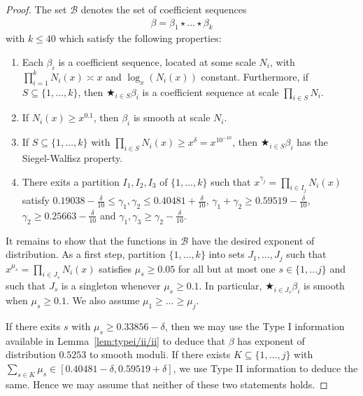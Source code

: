 \documentclass{amsart}
\numberwithin{equation}{section}
\begin{document}
\begin{proof}
\vspace{3mm} The set $\mathcal{B}$ denotes the set of coefficient sequences 
\begin{align*}
\beta=\beta_1 \star \dots \star \beta_{k}
\end{align*}
with $k \leq 40$ which satisfy the following properties:
\begin{enumerate}
\item Each $\beta_i$ is a coefficient sequence, located at some scale $N_i$, with $\prod_{ i =1}^k N_i(x) \asymp x$ and $\log_x(N_i(x))$ constant.   Furthermore, if $S \subseteq \{1, \dots, k\}$, then $\bigstar_{i \in S} \beta_i$ is a coefficient sequence at scale $\prod_{i \in S} N_i$.
\item If $N_i(x) \geq x^{0.1}$, then $\beta_i$ is smooth at scale $N_i$. 
\item If $S \subseteq \{1, \dots, k\}$ with $\prod_{i \in S} N_i(x) \geq x^{\delta} = x^{10^{-10}}$, then $\bigstar_{i \in S} \beta_i$ has the Siegel-Walfisz property. 
\item There exits a partition $I_1, I_2, I_3$ of $\{1, \dots, k\}$ such that $x^{\gamma_j}=\prod_{i \in I_j} N_i(x)$ satisfy  $0.19038-\frac{\delta}{10} \leq \gamma_1, \gamma_2 \leq 0.40481+\frac{\delta}{10}$, $\gamma_1 + \gamma_2 \geq 0.59519 - \frac{\delta}{10}$, $\gamma_2 \geq 0.25663-\frac{\delta}{10}$ and $\gamma_1, \gamma_3 \geq \gamma_2 - \frac{\delta}{10}$. 
\end{enumerate}

\vspace{3mm} It remains to show that the functions in $\mathcal{B}$ have the desired exponent of distribution.   As a first step, partition $\{1, \dots, k\}$ into sets $J_1, \dots, J_j$ such that $x^{\mu_s}=\prod_{i \in J_s} N_i(x)$ satisfies $\mu_s \geq 0.05$ for all but at most one $s \in \{1,\dots j\}$ and such that $J_s$ is a singleton whenever $\mu_s \geq 0.1$. In particular, $\bigstar_{i \in J_s} \beta_i$ is smooth when $\mu_s \geq 0.1$.  We also assume $\mu_1 \geq \dots \geq \mu_j$. 

\vspace{3mm} If there exits $s$ with $\mu_s \geq 0.33856-\delta$, then we may use the  Type I information available in  Lemma~\ref{lem:typei/ii/ii} to deduce that $\beta$ has exponent of distribution $0.5253$ to smooth moduli. If there exists $K \subseteq \{1, \dots, j\}$ with $\sum_{s \in K} \mu_s \in [0.40481-\delta,0.59519+\delta]$, we use Type II information to deduce  the same. Hence we may assume that neither of these two statements holds. 


\end{proof}
\end{document}
